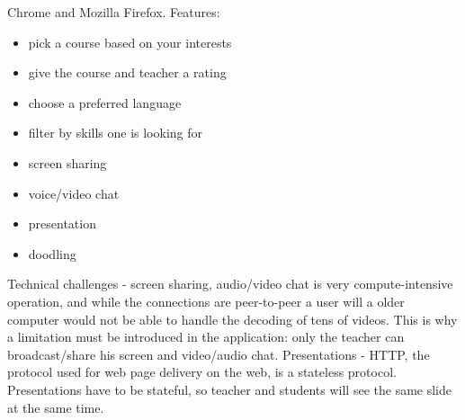Chrome and Mozilla Firefox.
Features:
\begin{itemize}
    \item pick a course based on your interests
    \item give the course and teacher a rating
    \item choose a preferred language
    \item filter by skills one is looking for
    \item screen sharing
    \item voice/video chat
    \item presentation
    \item doodling
\end{itemize}
Technical challenges - screen sharing, audio/video chat is very
compute-intensive operation, and while the connections are peer-to-peer
a user will a older computer would not be able to handle the decoding of tens of
videos. This is why a limitation must be introduced in the
application: only the teacher can broadcast/share his screen and video/audio
chat. Presentations - HTTP, the protocol used for web page delivery
on the web, is a stateless protocol. Presentations have to be stateful, so
teacher and students will see the same slide at the same time.
